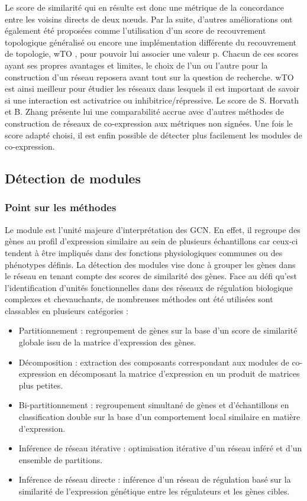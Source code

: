 Le score de similarité qui en résulte est donc une métrique de la concordance entre les voisins directs de deux nœuds. Par la suite, d'autres améliorations ont également été proposées comme l'utilisation d'un score de recouvrement topologique généralisé \cite{Yip2007Dec} ou encore une implémentation différente du recouvrement de topologie, wTO \cite{Gysi2018}, pour pouvoir lui associer une valeur p. Chacun de ces scores ayant ses propres avantages et limites, le choix de l'un ou l'autre pour la construction d'un réseau reposera avant tout sur la question de recherche. wTO est ainsi meilleur pour étudier les réseaux dans lesquels il est important de savoir si une interaction est activatrice ou inhibitrice/répressive. Le score de S. Horvath et B. Zhang présente lui une comparabilité accrue avec d'autres méthodes de construction de réseaux de co-expression aux métriques non signées. Une fois le score adapté choisi, il est enfin possible de détecter plus facilement les modules de co-expression.



\subsection{Détection de modules}

\subsubsection{Point sur les méthodes}

Le module est l'unité majeure d'interprétation des \acrshort{GCN}. En effet, il regroupe des gènes au profil d'expression similaire au sein de plusieurs échantillons car ceux-ci tendent à être impliqués dans des fonctions physiologiques communes ou des phénotypes définis. La détection des modules vise donc à grouper les gènes dans le réseau en tenant compte des scores de similarité des gènes. Face au défi qu'est l'identification d'unités fonctionnelles dans des réseaux de régulation biologique complexes et chevauchants, de nombreuses méthodes ont été utilisées sont classables en plusieurs catégories \cite{Saelens2018} : 
\begin{itemize}
    \item Partitionnement : regroupement de gènes sur la base d'un score de similarité globale issu de la matrice d'expression des gènes.
    \item Décomposition : extraction des composants correspondant aux modules de co-expression en décomposant la matrice d'expression en un produit de matrices plus petites.
    \item Bi-partitionnement : regroupement simultané de gènes et d'échantillons en classification double sur la base d'un comportement local similaire en matière d'expression.
    \item Inférence de réseau itérative : optimisation itérative d'un réseau inféré et d'un ensemble de partitions.
    \item Inférence de réseau directe : inférence d'un réseau de régulation basé sur la similarité de l'expression génétique entre les régulateurs et les gènes cibles.
\end{itemize} 
\hfill

